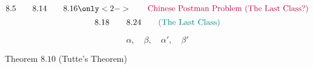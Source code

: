
\begin{frame}{}

  \[
    8.5 \qquad 8.14 \qquad 8.16 \only<2->{\qquad \text{\purple{Chinese Postman Problem (The Last Class?)}}}
  \]
  \[
    8.18 \qquad 8.24 \qquad \text{\textcolor{teal}{(The Last Class)}}
  \]
\end{frame}

\begin{frame}{}

  \vspace{-0.50cm}
  \[
    \alpha,\quad \beta,\quad \alpha',\quad \beta'
  \]
  \begin{center}
    Theorem $8.10$ (Tutte's Theorem) \quad {}
  \end{center}
\end{frame}
